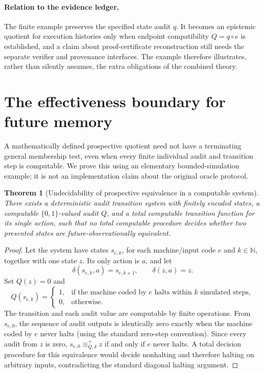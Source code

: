 \documentclass[11pt,letterpaper]{article}
\newtheorem{theorem}{Theorem}[section]
\theoremstyle{definition}
\newcommand{\N}{\mathbb N}
\begin{document}
\paragraph{Relation to the evidence ledger.} The finite example preserves the specified state audit $q$. It becomes an epistemic quotient for execution histories only when endpoint compatibility $Q=q\circ e$ is established, and a claim about proof-certificate reconstruction still needs the separate verifier and provenance interfaces. The example therefore illustrates, rather than silently assumes, the extra obligations of the combined theory.

\section{The effectiveness boundary for future memory}
A mathematically defined prospective quotient need not have a terminating general membership test, even when every finite individual audit and transition step is computable. We prove this using an elementary bounded-simulation example; it is not an implementation claim about the original oracle protocol.

\begin{theorem}[Undecidability of prospective equivalence in a computable system]\label{thm:undec}
There exists a deterministic audit transition system with finitely encoded states, a computable $\{0,1\}$-valued audit $Q$, and a total computable transition function for its single action, such that no total computable procedure decides whether two presented states are future-observationally equivalent.
\end{theorem}
\begin{proof}
Let the system have states $s_{e,k}$, for each machine/input code $e$ and $k\in\N$, together with one state $z$. Its only action is $a$, and let
\[
\delta(s_{e,k},a)=s_{e,k+1},\qquad \delta(z,a)=z.
\]
Set $Q(z)=0$ and
\[
Q(s_{e,k})=\begin{cases}
1,&\text{if the machine coded by $e$ halts within $k$ simulated steps},\\
0,&\text{otherwise.}
\end{cases}
\]
The transition and each audit value are computable by finite operations. From $s_{e,0}$, the sequence of audit outputs is identically zero exactly when the machine coded by $e$ never halts (using the standard zero-step convention). Since every audit from $z$ is zero, $s_{e,0}\equiv_{Q,\delta}^{+}z$ if and only if $e$ never halts. A total decision procedure for this equivalence would decide nonhalting and therefore halting on arbitrary inputs, contradicting the standard diagonal halting argument.
\end{proof}
\end{document}

